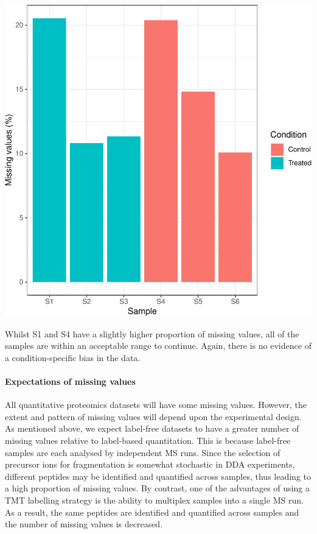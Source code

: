 \documentclass[9pt,a4paper,]{extarticle}
\begin{document}
\begin{center}\includegraphics[height=0.4\textheight]{workflow_expressions_files/figure-latex/lfq_missing_data_2-1} \end{center}

Whilst S1 and S4 have a slightly higher proportion of missing values, all of the
samples are within an acceptable range to continue. Again, there is no evidence
of a condition-specific bias in the data.

\paragraph{Expectations of missing values}\label{expectations-of-missing-values}

All quantitative proteomics datasets will have some missing values. However, the
extent and pattern of missing values will depend upon the experimental design. As
mentioned above, we expect label-free datasets to have a greater number of missing
values relative to label-based quantitation. This is because label-free samples
are each analysed by independent MS runs. Since the selection of precursor ions
for fragmentation is somewhat stochastic in DDA experiments, different peptides
may be identified and quantified across samples, thus leading to a high proportion
of missing values. By contrast, one of the advantages of using a TMT labelling
strategy is the ability to multiplex samples into a single MS run. As a result,
the same peptides are identified and quantified across samples and the number
of missing values is decreased.
\end{document}
